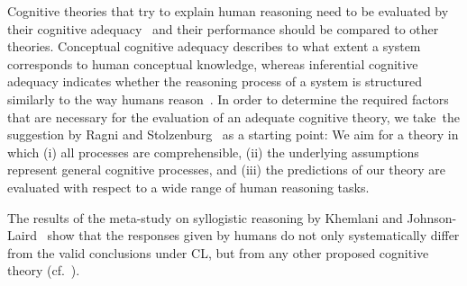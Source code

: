 \documentclass[12pt]{article}
\begin{document}
Cognitive theories that try to explain human reasoning need to be evaluated by their cognitive adequacy~\cite{strube:1992} and their performance should be compared to other theories.
Conceptual cognitive adequacy describes to what extent a system corresponds to human conceptual knowledge, whereas inferential cognitive adequacy indicates whether the reasoning process of a system is structured similarly to the way humans reason~\cite{knauff:rauh:renz:1997}. 
In order to determine the required factors that are necessary for the evaluation of an adequate cognitive theory, we take~the suggestion by Ragni and Stolzenburg~\cite{ragni:stolzenburg:2015} as a starting point:
We aim for a theory in which (i) all processes are comprehensible, (ii) the underlying assumptions represent general cognitive processes, and (iii) the predictions of our theory are evaluated with respect to a wide range of human reasoning tasks. 

% 
The results of the meta-study on syllogistic reasoning by Khemlani and Johnson-Laird~\cite{khemlani:2012} show that the responses given by humans do not only systematically differ from the valid conclusions under CL, but from any other proposed cognitive theory (cf.~\cite{BJ89,johnsonlaird:1983,Rips1994,Polk1995,chater:oaksford:1999}).
\end{document}
